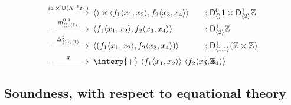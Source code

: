 \begin{example}
{{\begin{minipage}{1.04\linewidth}
\begin{align*}
\begin{array}{c l l}
\xrightarrow{\arw{\id \times \D (\uncurry \varepsilon_1)}}  
\hspace{-0.5em} & \langle\rangle \times \langle f_1 \langle x_1, x_2\rangle, f_2 \langle x_3, x_4\rangle\rangle & \hspace{-3.5em} : \D^0_{\langle{}\rangle} 1 \times \D^{1}_{\langle{2}\rangle} \mathbb{Z} \\[-0.2em]
\xrightarrow{\arw{\m^{0,1}_{\langle{}\rangle,\langle{1}\rangle}}} 
\hspace{-0.5em} & \langle f_1 \langle x_1, x_2\rangle, f_2 \langle x_3, x_4\rangle\rangle & \hspace{-3.5em}  : \D^1_{\langle{2}\rangle} \mathbb{Z} \\
\xrightarrow{\arw{\Delta^2_{\langle{1}\rangle,\langle{1}\rangle}}}
\hspace{-0.5em} & \langle(f_1 \langle x_1, x_2\rangle, f_2 \langle x_3, x_4\rangle)\rangle & \hspace{-3.5em} : \D^1_{\langle{1,1}\rangle} (\mathbb{Z} \times \mathbb{Z}) \\[0.54em]
\xrightarrow{\arw{g}} 
 \hspace{-0.5em} & \interp{+}\ \langle f_1 \langle x_1, x_2\rangle\rangle\ \langle f_2 \langle x_3, x_4\rangle\rangle & \hspace{-3.5em} : \mathbb{Z} 
\end{array}
\end{align*}
\end{minipage}
}}
\label{exm:run}
\end{example}


\subsection{Soundness, with respect to equational theory}
\label{sec:semantics-soundness}

